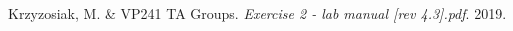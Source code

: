 \documentclass[a4paper,12pt]{article}
\begin{document}

\begin{thebibliography}{9}
 Krzyzosiak, M. \& VP241 TA Groups.
\textit{Exercise 2 - lab manual [rev 4.3].pdf}. 
2019.
\end{thebibliography}


\end{document}
